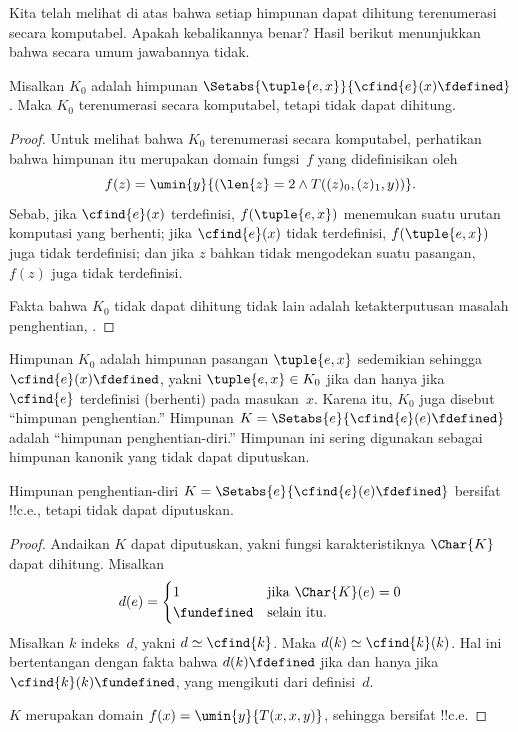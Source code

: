 \documentclass[../../../include/open-logic-section]{subfiles}
\begin{document}


Kita telah melihat di atas bahwa setiap himpunan dapat dihitung terenumerasi
secara komputabel. Apakah kebalikannya benar? Hasil berikut menunjukkan bahwa
secara umum jawabannya tidak.

\begin{thm}
Misalkan $K_0$ adalah himpunan
$\Setabs{\tuple{e, x}}{\cfind{e}(x) \fdefined}$. Maka $K_0$ terenumerasi
secara komputabel, tetapi tidak dapat dihitung.
\end{thm}

\begin{proof}
Untuk melihat bahwa $K_0$ terenumerasi secara komputabel, perhatikan bahwa
himpunan itu merupakan domain fungsi~$f$ yang didefinisikan oleh
\[
f(z) = \umin{y}{(\len{z} = 2 \land T((z)_0, (z)_1, y))}.
\]
Sebab, jika $\cfind{e}(x)$ terdefinisi, $f(\tuple{e, x})$ menemukan suatu
urutan komputasi yang berhenti; jika $\cfind{e}(x)$ tidak terdefinisi,
$f(\tuple{e, x})$ juga tidak terdefinisi; dan jika $z$ bahkan tidak mengodekan
suatu pasangan, $f(z)$ juga tidak terdefinisi.

Fakta bahwa $K_0$ tidak dapat dihitung tidak lain adalah ketakterputusan
masalah penghentian, .
\end{proof}

Himpunan $K_0$ adalah himpunan pasangan $\tuple{e,x}$ sedemikian sehingga
$\cfind{e}(x) \fdefined$, yakni $\tuple{e,x} \in K_0$ jika dan hanya jika
$\cfind{e}$ terdefinisi (berhenti) pada masukan~$x$. Karena itu, $K_0$ juga
disebut ``himpunan penghentian.'' Himpunan
$K = \Setabs{e}{\cfind{e}(e) \fdefined}$ adalah ``himpunan penghentian-diri.''
Himpunan ini sering digunakan sebagai himpunan kanonik yang tidak dapat
diputuskan.

\begin{thm}
Himpunan penghentian-diri $K = \Setabs{e}{\cfind{e}(e) \fdefined}$ bersifat
!!{c.e.}, tetapi tidak dapat diputuskan.
\end{thm}

\begin{proof}
  Andaikan $K$ dapat diputuskan, yakni fungsi karakteristiknya $\Char{K}$
  dapat dihitung. Misalkan
  \[d(e) = \begin{cases}
  1 & \text{jika\/ $\Char{K}(e) = 0$}\\
  \fundefined & \text{selain itu.}
  \end{cases}
  \]
  Misalkan $k$ indeks~$d$, yakni $d \simeq \cfind{k}$. Maka
  $d(k) \simeq \cfind{k}(k)$. Hal ini bertentangan dengan fakta bahwa
  $d(k) \fdefined$ jika dan hanya jika $\cfind{k}(k) \fundefined$, yang
  mengikuti dari definisi~$d$.

  $K$ merupakan domain $f(x) = \umin{y}{T(x,x,y)}$, sehingga bersifat !!{c.e.}
\end{proof}
\end{document}
